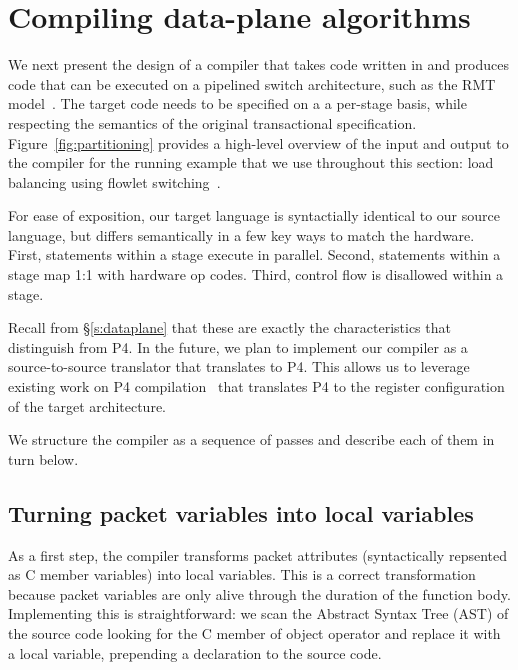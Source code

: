 \section{Compiling data-plane algorithms}
\label{s:compiler}

We next present the design of a compiler that takes code written in \pktlanguage{}
and produces code that can be executed on a pipelined switch architecture, such
as the RMT model~\cite{rmt}. The target code needs to be specified on a a
per-stage basis, while respecting the semantics of the original transactional
specification.  Figure~\ref{fig:partitioning} provides a high-level overview of
the input and output to the compiler for the running example that we use
throughout this section: load balancing using flowlet
switching~\cite{dina_flowlets}.

For ease of exposition, our target language is syntactially identical to our
source language, but differs semantically in a few key ways to match the
hardware. First, statements within a stage execute in parallel. Second,
statements within a stage map 1:1 with hardware op codes. Third, control flow
is disallowed within a stage.

Recall from \S\ref{s:dataplane} that these are exactly the characteristics that
distinguish \pktlanguage{} from P4. In the future, we plan to implement our
compiler as a source-to-source translator that translates \pktlanguage{} to P4.
This allows us to leverage existing work on P4
compilation~\cite{lavanya_compiler, brebner, netronome} that translates P4 to
the register configuration of the target architecture.

We structure the compiler as a sequence of passes and describe each of them in
turn below. 

\subsection{Turning packet variables into local variables}
As a first step, the compiler transforms packet attributes (syntactically
repsented as C member variables) into local variables.  This is a correct
transformation because packet variables are only alive through the duration of
the function body. Implementing this is straightforward: we scan the Abstract
Syntax Tree (AST) of the source code looking for the C member of object
operator and replace it with a local variable, prepending a declaration to the
source code.


